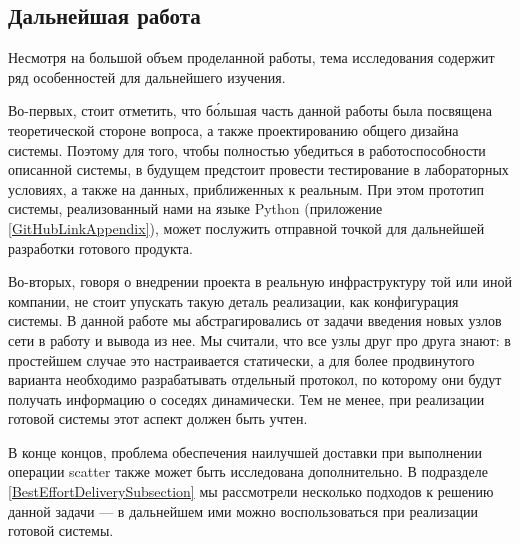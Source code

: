 {}
\subsection*{Дальнейшая работа}

Несмотря на большой объем проделанной работы, тема исследования содержит ряд особенностей для дальнейшего изучения.

Во-первых, стоит отметить, что б\'{о}льшая часть данной работы была посвящена теоретической стороне вопроса, а также проектированию общего дизайна системы. Поэтому для того, чтобы полностью убедиться в работоспособности описанной системы, в будущем предстоит провести тестирование в лабораторных условиях, а также на данных, приближенных к реальным. При этом прототип системы, реализованный нами на языке Python (приложение \ref{GitHubLinkAppendix}), может послужить отправной точкой для дальнейшей разработки готового продукта.

Во-вторых, говоря о внедрении проекта в реальную инфраструктуру той или иной компании, не стоит упускать такую деталь реализации, как конфигурация системы. В данной работе мы абстрагировались от задачи введения новых узлов сети в работу и вывода из нее. Мы считали, что все узлы друг про друга знают: в простейшем случае это настраивается статически, а для более продвинутого варианта необходимо разрабатывать отдельный протокол, по которому они будут получать информацию о соседях динамически. Тем не менее, при реализации готовой системы этот аспект должен быть учтен.

В конце концов, проблема обеспечения наилучшей доставки при выполнении операции scatter также может быть исследована дополнительно. В подразделе \ref{BestEffortDeliverySubsection} мы рассмотрели несколько подходов к решению данной задачи --- в дальнейшем ими можно воспользоваться при реализации готовой системы.

\cleardoublepage




\cleardoublepage

